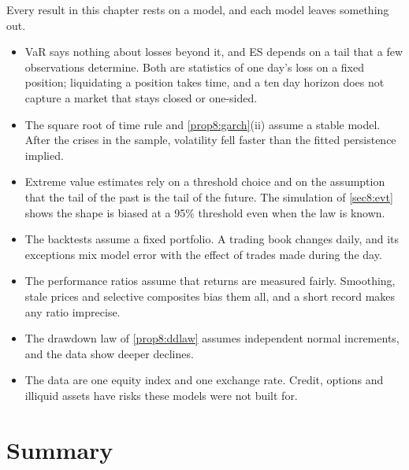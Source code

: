 \begin{chapterrefs}
Every result in this chapter rests on a model, and each model leaves something out.
\begin{itemize}
  \item VaR says nothing about losses beyond it, and ES depends on a tail that a few observations
        determine. Both are statistics of one day's loss on a fixed position; liquidating a position
        takes time, and a ten day horizon does not capture a market that stays closed or one-sided.
  \item The square root of time rule and \cref{prop8:garch}(ii) assume a stable model. After the
        crises in the sample, volatility fell faster than the fitted persistence implied.
  \item Extreme value estimates rely on a threshold choice and on the assumption that the tail of
        the past is the tail of the future. The simulation of \cref{sec8:evt} shows the shape is
        biased at a 95\% threshold even when the law is known.
  \item The backtests assume a fixed portfolio. A trading book changes daily, and its exceptions
        mix model error with the effect of trades made during the day.
  \item The performance ratios assume that returns are measured fairly. Smoothing, stale prices and
        selective composites bias them all, and a short record makes any ratio imprecise.
  \item The drawdown law of \cref{prop8:ddlaw} assumes independent normal increments, and the
        data show deeper declines.
  \item The data are one equity index and one exchange rate. Credit, options and illiquid assets
        have risks these models were not built for.
\end{itemize}

\FloatBarrier
\section{Summary}
\label{sec8:summary}


\end{chapterrefs}
